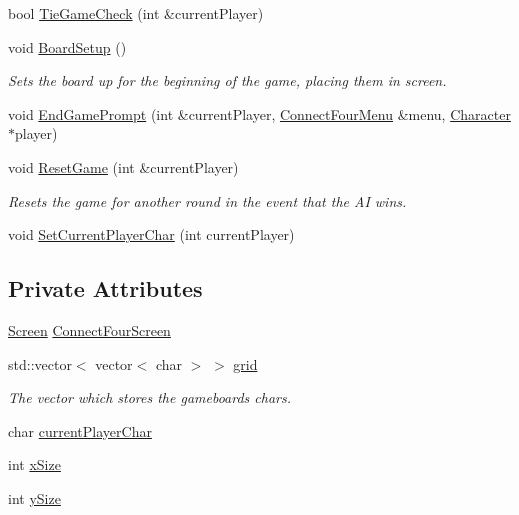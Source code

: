 \begin{DoxyCompactItemize}
bool \hyperlink{classConnectFour_a6f356156a6c23ee1f5838cd96b3b84bc}{Tie\-Game\-Check} (int \&current\-Player)
\item 
void \hyperlink{classConnectFour_ad453f2707d1ae7bb87cdd2d46010d951}{Board\-Setup} ()
\begin{DoxyCompactList}\small\item\em Sets the board up for the beginning of the game, placing them in screen. \end{DoxyCompactList}\item 
void \hyperlink{classConnectFour_a735502158808aaa23f0a2d38ac3f841f}{End\-Game\-Prompt} (int \&current\-Player, \hyperlink{classConnectFourMenu}{Connect\-Four\-Menu} \&menu, \hyperlink{classCharacter}{Character} $\ast$player)
\item 
void \hyperlink{classConnectFour_aaf17855d2cec2d71c07614af530a00bf}{Reset\-Game} (int \&current\-Player)
\begin{DoxyCompactList}\small\item\em Resets the game for another round in the event that the A\-I wins. \end{DoxyCompactList}\item 
void \hyperlink{classConnectFour_a8f74f9d22c247508e868222c27136641}{Set\-Current\-Player\-Char} (int current\-Player)
\end{DoxyCompactItemize}
\subsection*{Private Attributes}
\begin{DoxyCompactItemize}
\item 
\hyperlink{classScreen}{Screen} \hyperlink{classConnectFour_a7548207e4c83260233e8d3668ae3e7e2}{Connect\-Four\-Screen}
\item 
std\-::vector$<$ vector$<$ char $>$ $>$ \hyperlink{classConnectFour_a42275b6a7a1b490b7e9adc3e2d5480d9}{grid}
\begin{DoxyCompactList}\small\item\em The vector which stores the gameboards chars. \end{DoxyCompactList}\item 
char \hyperlink{classConnectFour_adc938d715dbe28efc1db3b4a1dc866cb}{current\-Player\-Char}
\item 
int \hyperlink{classConnectFour_a9ebcc46eaaac1805eab8b90925f83a63}{x\-Size}
\item 
int \hyperlink{classConnectFour_acd39fbfa19a81ab05e7aae3ac51e9ed8}{y\-Size}
\end{DoxyCompactItemize}
